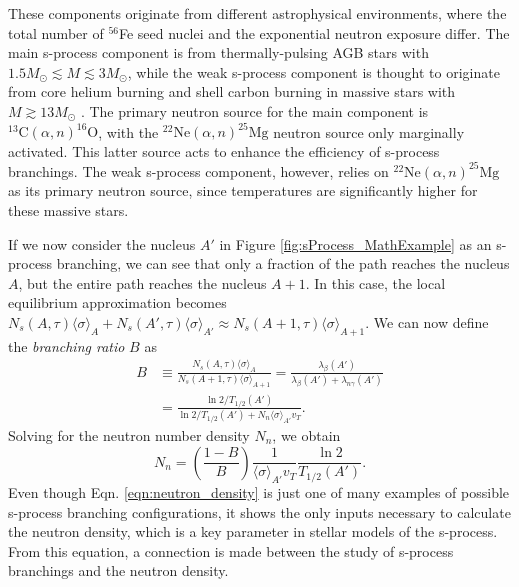 These components originate from different astrophysical environments, where the total number of $^{56}$Fe seed nuclei and the exponential neutron exposure differ. The main s-process component is from thermally-pulsing AGB stars with $1.5 M_{\odot} \lesssim M \lesssim 3 M_{\odot}$, while the weak s-process component is thought to originate from core helium burning and shell carbon burning in massive stars with $M \gtrsim 13 M_{\odot}$ \cite{Iliadis2015}. The primary neutron source for the main component is $^{13}\mathrm{C}(\alpha,n)^{16}\mathrm{O}$, with the $^{22}\mathrm{Ne}(\alpha,n)^{25}\mathrm{Mg}$ neutron source only marginally activated. This latter source acts to enhance the efficiency of s-process branchings. The weak s-process component, however, relies on $^{22}\mathrm{Ne}(\alpha,n)^{25}\mathrm{Mg}$ as its primary neutron source, since temperatures are significantly higher for these massive stars.

If we now consider the nucleus $A'$ in Figure \ref{fig:sProcess_MathExample} as an s-process branching, we can see that only a fraction of the path reaches the nucleus $A$, but the entire path reaches the nucleus $A+1$. In this case, the local equilibrium approximation becomes $N_{s}(A,\tau)\langle \sigma \rangle_{A} + N_{s}(A',\tau)\langle \sigma \rangle_{A'} \approx N_{s}(A+1,\tau)\langle \sigma \rangle_{A+1}$. We can now define the \emph{branching ratio} $B$ as
\begin{align}
B &\equiv \frac{N_{s}(A,\tau)\langle \sigma \rangle_{A}}{N_{s}(A+1,\tau)\langle \sigma \rangle_{A+1}} = \frac{\lambda_{\beta}(A')}{\lambda_{\beta}(A') + \lambda_{n\gamma}(A')} \nonumber \\
&= \frac{\ln 2 / T_{1/2}(A')}{\ln 2 / T_{1/2}(A') + N_{n} \langle \sigma \rangle_{A'} v_{T}}.
\end{align}
Solving for the neutron number density $N_{n}$, we obtain
\begin{equation} \label{eqn:neutron_density}
N_{n} = \left( \frac{1-B}{B} \right) \frac{1}{\langle \sigma \rangle_{A'} v_{T}} \frac{\ln 2}{T_{1/2}(A')}.
\end{equation}
Even though Eqn. \ref{eqn:neutron_density} is just one of many examples of possible s-process branching configurations, it shows the only inputs necessary to calculate the neutron density, which is a key parameter in stellar models of the s-process. From this equation, a connection is made between the study of s-process branchings and the neutron density. 

